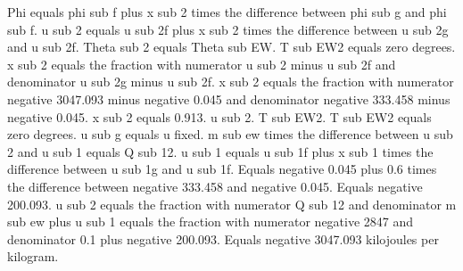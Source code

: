 Phi equals phi sub f plus x sub 2 times the difference between phi sub g and phi sub f.
u sub 2 equals u sub 2f plus x sub 2 times the difference between u sub 2g and u sub 2f.
Theta sub 2 equals Theta sub EW.
T sub EW2 equals zero degrees.
x sub 2 equals the fraction with numerator u sub 2 minus u sub 2f and denominator u sub 2g minus u sub 2f.
x sub 2 equals the fraction with numerator negative 3047.093 minus negative 0.045 and denominator negative 333.458 minus negative 0.045.
x sub 2 equals 0.913.
u sub 2.
T sub EW2.
T sub EW2 equals zero degrees.
u sub g equals u fixed.
m sub ew times the difference between u sub 2 and u sub 1 equals Q sub 12.
u sub 1 equals u sub 1f plus x sub 1 times the difference between u sub 1g and u sub 1f.
Equals negative 0.045 plus 0.6 times the difference between negative 333.458 and negative 0.045.
Equals negative 200.093.
u sub 2 equals the fraction with numerator Q sub 12 and denominator m sub ew plus u sub 1 equals the fraction with numerator negative 2847 and denominator 0.1 plus negative 200.093.
Equals negative 3047.093 kilojoules per kilogram.